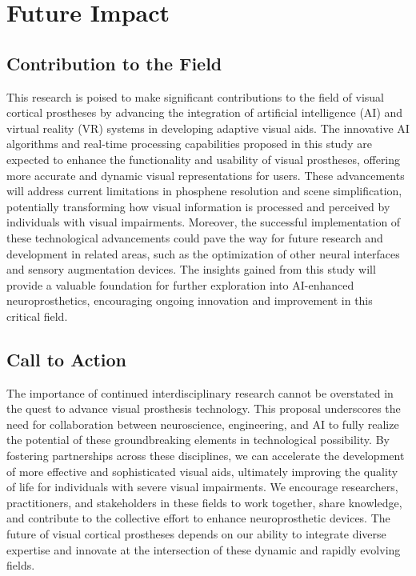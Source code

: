 \documentclass[10pt]{article}
\begin{document}
\section*{Future Impact}\label{sec:impact}
\subsection*{Contribution to the Field}
This research is poised to make significant contributions to the field of visual
cortical prostheses by advancing the integration of artificial intelligence (AI)
and virtual reality (VR) systems in developing adaptive visual aids. The
innovative AI algorithms and real-time processing capabilities proposed in this
study are expected to enhance the functionality and usability of visual
prostheses, offering more accurate and dynamic visual representations for users.
These advancements will address current limitations in phosphene resolution and
scene simplification, potentially transforming how visual information is
processed and perceived by individuals with visual impairments. Moreover, the
successful implementation of these technological advancements could pave the way
for future research and development in related areas, such as the optimization
of other neural interfaces and sensory augmentation devices. The insights gained
from this study will provide a valuable foundation for further exploration into
AI-enhanced neuroprosthetics, encouraging ongoing innovation and improvement in
this critical field.

\subsection*{Call to Action}
The importance of continued interdisciplinary research cannot be overstated in
the quest to advance visual prosthesis technology. This proposal underscores the
need for collaboration between neuroscience, engineering, and AI to fully
realize the potential of these groundbreaking elements in technological
possibility. By fostering partnerships across these disciplines, we can
accelerate the development of more effective and sophisticated visual aids,
ultimately improving the quality of life for individuals with severe visual
impairments. We encourage researchers, practitioners, and stakeholders in these
fields to work together, share knowledge, and contribute to the collective
effort to enhance neuroprosthetic devices. The future of visual cortical
prostheses depends on our ability to integrate diverse expertise and innovate at
the intersection of these dynamic and rapidly evolving fields.
\end{document}
